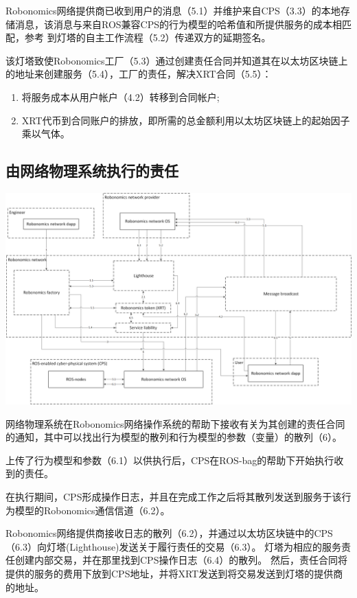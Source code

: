 \documentclass[UTF8]{article}
\begin{document}
Robonomics网络提供商已收到用户的消息（5.1）并维护来自CPS（3.3）的本地存储消息，该消息与来自ROS兼容CPS的行为模型的哈希值和所提供服务的成本相匹配，参考 到灯塔的自主工作流程（5.2）传递双方的延期签名。

该灯塔致使Robonomics工厂（5.3）通过创建责任合同并知道其在以太坊区块链上的地址来创建服务（5.4），工厂的责任，解决XRT合同（5.5）：
\begin{enumerate}
	\item 将服务成本从用户帐户（4.2）转移到合同帐户;
	\item XRT代币到合同账户的排放，即所需的总金额利用以太坊区块链上的起始因子乘以气体。
\end{enumerate}

\subsection{由网络物理系统执行的责任}

\includegraphics[width=1\textwidth]{step-by-step-6.png} 

网络物理系统在Robonomics网络操作系统的帮助下接收有关为其创建的责任合同的通知，其中可以找出行为模型的散列和行为模型的参数（变量）的散列（6）。

上传了行为模型和参数（6.1）以供执行后，CPS在ROS-bag的帮助下开始执行收到的责任。

在执行期间，CPS形成操作日志，并且在完成工作之后将其散列发送到服务于该行为模型的Robonomics通信信道（6.2）。

Robonomics网络提供商接收日志的散列（6.2），并通过以太坊区块链中的CPS（6.3）向灯塔(Lighthouse)发送关于履行责任的交易（6.3）。 灯塔为相应的服务责任创建内部交易，并在那里找到CPS操作日志（6.4）的散列。 然后，责任合同将提供的服务的费用下放到CPS地址，并将XRT发送到将交易发送到灯塔的提供商的地址。
\end{document}

